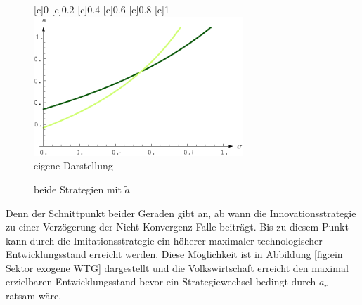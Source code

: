 	\begin{figure}[htbp]
		\vspace{0.13cm}
		\centering
		\psfrag{\sigma}{$\sigma$}
		[c]{\scriptsize{0}}
		[c]{\scriptsize{0.2}}
		[c]{\scriptsize{0.4}}
		[c]{\scriptsize{0.6}}
		[c]{\scriptsize{0.8}}
		[c]{\scriptsize{1}}
		\includegraphics[width=0.7\textwidth]{images/Abbildungen/beideATildeInEinerAbbEx.eps}\\
		\hfill\footnotesize{}  eigene Darstellung
		\caption{beide Strategien mit $\widetilde{a}$}
		\label{fig:beide Strategien mitaTilde}
	\end{figure}


Denn der Schnittpunkt beider Geraden gibt an, ab wann die \textcolor[rgb]{0.74,0.97,0.22}{Innovationsstrategie} zu einer Verzögerung der Nicht-Konvergenz-Falle beiträgt. Bis zu diesem Punkt kann durch die \textcolor[rgb]{0,0.32,0}{Imitationsstrategie} ein höherer maximaler technologischer Entwicklungsstand erreicht werden. Diese Möglichkeit ist in Abbildung \ref{fig:ein Sektor exogene WTG} dargestellt und die Volkswirtschaft erreicht den maximal erzielbaren Entwicklungsstand bevor ein Strategiewechsel bedingt durch $a_r$ ratsam wäre.\\


